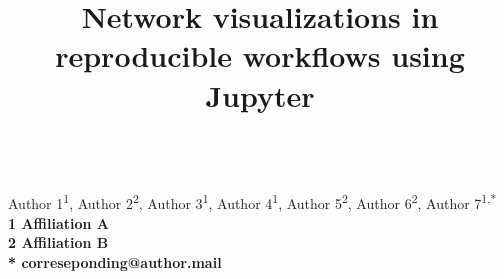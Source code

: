 \documentclass[10pt,letterpaper]{article}
\begin{document}
\vspace*{0.35in}

\title{Network visualizations in reproducible workflows using Jupyter}

\begin{flushleft}
{\Large
\textbf{}
}
\newline
\\
Author 1\textsuperscript{1},
Author 2\textsuperscript{2},
Author 3\textsuperscript{1},
Author 4\textsuperscript{1},
Author 5\textsuperscript{2},
Author 6\textsuperscript{2},
Author 7\textsuperscript{1,*}
\\
\bigskip
\bf{1} Affiliation A
\\
\bf{2} Affiliation B
\\
\bigskip
* correseponding@author.mail

\end{flushleft}

\linenumbers







%
\end{document}

